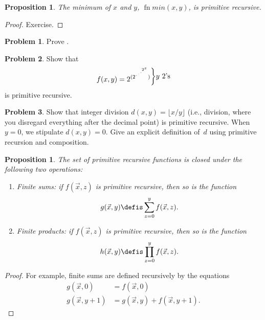 \documentclass[10pt,a4paper]{article}
\makeatletter
\theoremstyle{plain}
\newtheorem{prop}[thm]{Proposition}
\theoremstyle{definition}
\newtheorem{prob}{Problem}[section]
\theoremstyle{remark}
\newcommand*{\ollabel}[1]{\label{#1}}
\newcommand{\olref}{\@ifnextchar[{\olref@i}{\olref@final}}
\def\olref@i[#1]{\@ifnextchar[{\olref@ii}{\olref@final}}
\def\olref@ii[#1]{\@ifnextchar[{\olref@iii}{\olref@final}}
\def\olref@iii[#1]{\olref@final}
\def\olref@final#1{\ref{#1}}
\providecommand{\fn}{\operatorname{fn}}
\providecommand{\fn}{\operatorname{fn}}
\makeatother
\begin{document}
\begin{prop}
  \ollabel{prop:min-pr}
  The minimum of $x$ and $y$, $\fn{min}(x,y)$, is primitive recursive.
\end{prop}

\begin{proof}
  Exercise.
\end{proof}

\begin{prob}
  Prove \olref[cmp][rec][exa]{prop:min-pr}.
\end{prob}

\begin{prob}
Show that \[
f(x, y) =
2^{(2^{\iddots^{2^{x}}})}\raisebox{1ex}{\bigg\rbrace}
\raisebox{1ex}{\text {$y$ $2$'s}}\] is primitive recursive.
\end{prob}

\begin{prob}
Show that integer division $d(x, y) = \lfloor x/y \rfloor$ (i.e.,
division, where you disregard everything after the decimal point) is
primitive recursive. When $y = 0$, we stipulate $d(x, y) = 0$. Give an
explicit definition of~$d$ using primitive recursion and
composition.
\end{prob}

\begin{prop}
The set of primitive recursive functions is closed under the
following two operations:
\begin{enumerate}
\item Finite sums: if $f(\vec x, z)$ is primitive recursive, then so
is the function
\[
g(\vec x, y) \defis \sum_{z = 0}^y f(\vec x, z).
\]
\item Finite products: if $f(\vec x, z)$ is primitive recursive, then
so is the function
\[
h(\vec x, y) \defis \prod_{z = 0}^y f(\vec x, z).
\]
\end{enumerate}
\end{prop}

\begin{proof}
For example, finite sums are defined recursively by the equations
\begin{align*}
  g(\vec x, 0) & = f(\vec x, 0)\\
  g(\vec x, y+1) & = g(\vec x, y) + f(\vec x, y+1).
\end{align*}
\end{proof}



\end{document}
